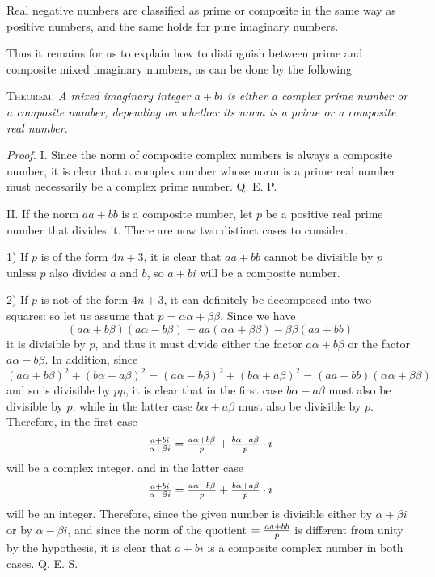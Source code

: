 \documentclass[twoside,12pt]{memoir}
\let\oldfrac\frac
\def\frac#1#2{\mathchoice{\tfrac{#1}{#2}}{\oldfrac{#1}{#2}}{\genfrac{}{}{}{2}{#1}{#2\mathstrut}}{\genfrac{}{}{}{3}{#1}{#2\mathstrut}}}
\begin{document}
Real negative numbers are classified as prime or composite in the same way as positive numbers, and the same holds for pure imaginary numbers.

Thus it remains for us to explain how to distinguish between prime and composite mixed imaginary numbers, as can be done by the following

\textsc{Theorem.} \textit{A mixed imaginary integer \(a+b i\) is either a complex prime number or a composite number, depending on whether its norm is a prime or a composite real number.}

\textit{Proof.} I. Since the norm of composite complex numbers is always a composite number, it is clear that a complex number whose norm is a prime real number must necessarily be a complex prime number. Q. E. P.

II. If the norm \(a a+b b\) is a composite number, let \(p\) be a positive real prime number that divides it. There are now two distinct cases to consider.

1) If \(p\) is of the form \(4 n+3\), it is clear that \(a a+b b\) cannot be divisible by \(p\) unless \(p\) also divides \(a\) and \(b\), so \(a+b i\) will be a composite number.

2) If \(p\) is not of the form \(4 n+3\), it can definitely be decomposed into two squares: so let us assume that \(p=\alpha \alpha+\beta \beta\). Since we have
\[(a \alpha+b \beta)(a \alpha-b \beta)=a a(\alpha \alpha+\beta \beta)-\beta \beta(a a+b b)\]
it is divisible by \(p\), and thus it must divide either the factor \(a \alpha+b \beta\) or the factor \(a \alpha-b \beta\). In addition, since
\[(a \alpha+b \beta)^{2}+(b \alpha-a \beta)^{2}=(a \alpha-b \beta)^{2}+(b \alpha+a \beta)^{2}=(a a+b b)(\alpha \alpha+\beta \beta)\]
and so is divisible by \(p p\), it is clear that in the first case \(b \alpha-a \beta\) must also be divisible by \(p\), while in the latter case \(b \alpha+a \beta\) must also be divisible by \(p\). Therefore, in the first case
\[\frac{a+b i}{\alpha+\beta i}=\frac{a \alpha+b \beta}{p}+\frac{b \alpha-a \beta}{p} \cdot i\]
will be a complex integer, and in the latter case
\[\frac{a+b i}{\alpha-\beta i}=\frac{a \alpha-b \beta}{p}+\frac{b \alpha+a \beta}{p} \cdot i\]
will be an integer. Therefore, since the given number is divisible either by \(\alpha+\beta i\) or by \(\alpha-\beta i\), and since the norm of the quotient \(=\frac{a a+b b}{p}\) is different from unity by the hypothesis, it is clear that \(a+b i\) is a composite complex number in both cases. Q. E. S.\pagebreak%
\end{document}
